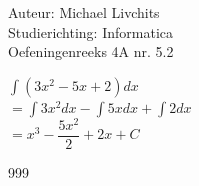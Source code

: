 \documentclass[a4paper]{article}
\begin{document}
  
\noindent \large Auteur: Michael Livchits \\
\noindent \large Studierichting: Informatica\\
\noindent \large Oefeningenreeks 4A nr. 5.2\\

\medskip

\normalsize

$\displaystyle\int (3x^2 - 5x + 2) dx$\\

$= \displaystyle\int 3x^2 dx - \displaystyle\int 5x dx + \displaystyle\int 2 dx$\\

$= x^3 -\dfrac{5x^2}{2} + 2x + C$

\begin{thebibliography}{999}
\end{thebibliography}
\end{document}

